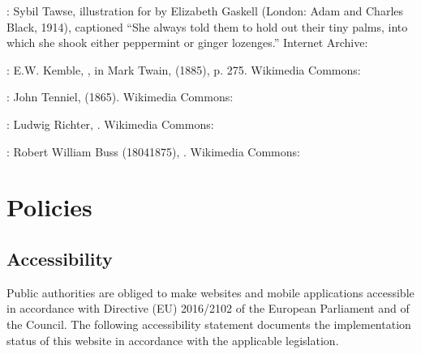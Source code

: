 \documentclass[letterpaper,10pt,english]{sphinxmanual}
\begin{document}
\sphinxAtStartPar
{}: Sybil Tawse, illustration for  by Elizabeth Gaskell (London: Adam and Charles Black, 1914), captioned “She always told them to hold out their tiny palms, into which she shook either peppermint or ginger lozenges.” Internet Archive: 

\sphinxAtStartPar
{}: E.W. Kemble, , in Mark Twain,  (1885), p. 275. Wikimedia Commons: 

\sphinxAtStartPar
{}: John Tenniel,  (1865). Wikimedia Commons: 

\sphinxAtStartPar
{}: Ludwig Richter, . Wikimedia Commons: 

\sphinxAtStartPar
{}: Robert William Buss (1804\textendash{}1875), . Wikimedia Commons: 

\sphinxstepscope


\chapter{Policies}
\label{\detokenize{policies:policies}}\label{\detokenize{policies::doc}}
\sphinxstepscope


\section{Accessibility}
\label{\detokenize{policies/accessibility:accessibility}}\label{\detokenize{policies/accessibility::doc}}
\sphinxAtStartPar
Public authorities are obliged to make websites and mobile applications accessible in accordance with Directive (EU) 2016/2102 of the European Parliament and of the Council. The following accessibility statement documents the implementation status of this website in accordance with the applicable legislation.
\end{document}
